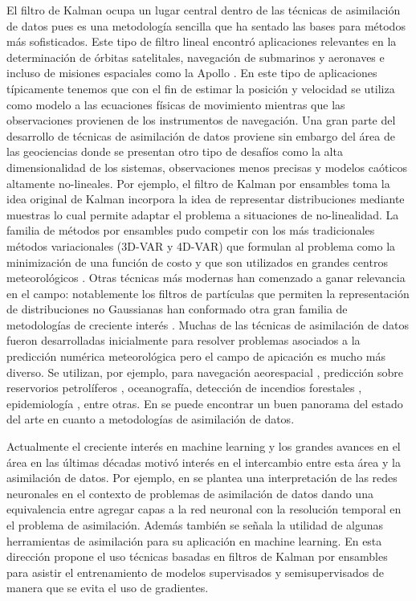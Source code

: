 El filtro de Kalman \citep{Kalman1960, Kalman1961} ocupa un lugar central dentro de las técnicas de asimilación de datos pues es una metodología sencilla que ha sentado las bases para métodos más sofisticados. Este tipo de filtro lineal encontró aplicaciones relevantes en la determinación de órbitas satelitales, navegación de submarinos y aeronaves e incluso de misiones espaciales como la Apollo \citep{Jazwinski1970}. En este tipo de aplicaciones típicamente tenemos que con el fin de estimar la posición y velocidad se utiliza como modelo a las ecuaciones físicas de movimiento mientras que las observaciones provienen de los instrumentos de navegación. Una gran parte del desarrollo de técnicas de asimilación de datos proviene sin embargo del área de las geociencias donde se presentan otro tipo de desafíos como la alta dimensionalidad de los sistemas, observaciones menos precisas y modelos caóticos altamente no-lineales. Por ejemplo, el filtro de Kalman por ensambles \citep{Evensen1994} toma la idea original de Kalman incorpora la idea de representar distribuciones mediante muestras lo cual permite adaptar el problema a situaciones de no-linealidad. La familia de métodos por ensambles pudo competir con los más tradicionales métodos variacionales (3D-VAR y 4D-VAR) que formulan al problema como la minimización de una función de costo y que son utilizados en grandes centros meteorológicos \citep{Kalnay2007}. Otras técnicas más modernas han comenzado a ganar relevancia en el campo: notablemente los filtros de partículas que permiten la representación de distribuciones no Gaussianas han conformado otra gran familia de metodologías de creciente interés \citep{vanLeeuwen2019}. Muchas de las técnicas de asimilación de datos fueron desarrolladas inicialmente para resolver problemas asociados a la predicción numérica meteorológica pero el campo de apicación es mucho más diverso. Se utilizan, por ejemplo, para navegación aeorespacial \cite{Grewal2010}, predicción sobre reservorios petrolíferos \cite{Aanonsen2009}, oceanografía, detección de incendios forestales \citep{Mandel2008}, epidemiología \citep{Shaman2012}, entre otras. En \cite{Carrassi2018} se puede encontrar un buen panorama del estado del arte en cuanto a metodologías de asimilación de datos.

Actualmente el creciente interés en machine learning y los grandes avances en el área en las últimas décadas motivó interés en el intercambio entre esta área y la asimilación de datos. Por ejemplo, en \cite{Abarbanel2018} se plantea una interpretación de las redes neuronales en el contexto de  problemas de asimilación de datos dando una equivalencia entre agregar capas a la red neuronal con la resolución temporal en el problema de asimilación. Además también se señala la utilidad de algunas herramientas de asimilación para su aplicación en machine learning. En esta dirección \cite{Kovachki2019} propone el uso técnicas basadas en filtros de Kalman por ensambles para asistir el entrenamiento de modelos supervisados y semisupervisados de manera que se evita el uso de gradientes.

